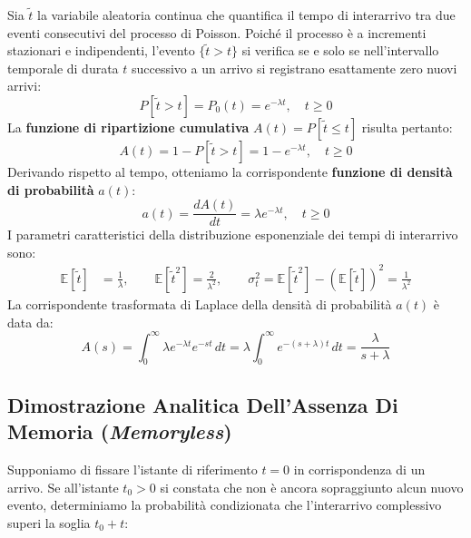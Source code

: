 \documentclass[11pt, a4paper]{article}
\begin{document}
Sia $\tilde{t}$ la variabile aleatoria continua che quantifica il tempo di interarrivo tra due eventi consecutivi del processo di Poisson. Poiché il processo è a incrementi stazionari e indipendenti, l'evento $\{\tilde{t} > t\}$ si verifica se e solo se nell'intervallo temporale di durata $t$ successivo a un arrivo si registrano esattamente zero nuovi arrivi:
\[
    P[\tilde{t} > t] = P_0(t) = e^{-\lambda t}, \quad t \ge 0
\]
La \textbf{funzione di ripartizione cumulativa} $A(t) = P[\tilde{t} \le t]$ risulta pertanto:
\[
    \boxed{A(t) = 1 - P[\tilde{t} > t] = 1 - e^{-\lambda t}, \quad t \ge 0}
\]
Derivando rispetto al tempo, otteniamo la corrispondente \textbf{funzione di densità di probabilità} $a(t)$:
\[
    \boxed{a(t) = \frac{d A(t)}{dt} = \lambda e^{-\lambda t}, \quad t \ge 0}
\]
I parametri caratteristici della distribuzione esponenziale dei tempi di interarrivo sono:
\begin{align*}
    \mathbb{E}[\tilde{t}] &= \frac{1}{\lambda}, \qquad \mathbb{E}[\tilde{t}^2] = \frac{2}{\lambda^2}, \qquad \sigma_t^2 = \mathbb{E}[\tilde{t}^2] - (\mathbb{E}[\tilde{t}])^2 = \frac{1}{\lambda^2}
\end{align*}
La corrispondente trasformata di Laplace della densità di probabilità $a(t)$ è data da:
\[
    A(s) = \int_0^{\infty} \lambda e^{-\lambda t} e^{-st}\,dt = \lambda \int_0^{\infty} e^{-(s+\lambda)t}\,dt = \boxed{\frac{\lambda}{s+\lambda}}
\]

\subsection{Dimostrazione Analitica Dell'Assenza Di Memoria (\emph{Memoryless})}

Supponiamo di fissare l'istante di riferimento $t=0$ in corrispondenza di un arrivo. Se all'istante $t_0 > 0$ si constata che non è ancora sopraggiunto alcun nuovo evento, determiniamo la probabilità condizionata che l'interarrivo complessivo superi la soglia $t_0 + t$:

\end{document}
